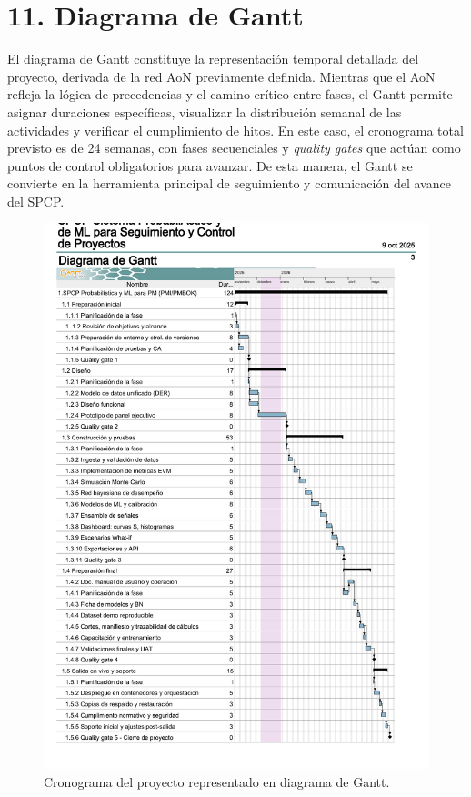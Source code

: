 \documentclass[12pt]
{charter}
\begin{document}
\FloatBarrier

\section{11. Diagrama de Gantt}
\label{sec:gantt}

El diagrama de Gantt constituye la representación temporal detallada del proyecto, derivada de la red AoN previamente definida. 
Mientras que el AoN refleja la lógica de precedencias y el camino crítico entre fases, el Gantt permite asignar duraciones específicas, visualizar la distribución semanal de las actividades y verificar el cumplimiento de hitos. 
En este caso, el cronograma total previsto es de 24 semanas, con fases secuenciales y \textit{quality gates} que actúan como puntos de control obligatorios para avanzar. 
De esta manera, el Gantt se convierte en la herramienta principal de seguimiento y comunicación del avance del SPCP.

\begin{figure}[ht]
  \centering
  \includegraphics[trim=0 194 0 65,clip,width=\textwidth]{Figuras/CEIA_TF_SPCP_Gantt_p03.pdf}
  \caption{Cronograma del proyecto representado en diagrama de Gantt.}
  \label{fig:gantt_p04}
\end{figure}
\FloatBarrier
\end{document}
